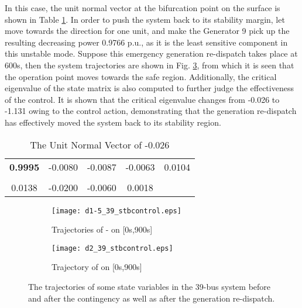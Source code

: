 \documentclass[journal]{IEEEtran}
\begin{document}
In this case, the unit normal vector at the bifurcation point on the surface is shown in Table \ref{39-stbNV}. In order to push the system back to its stability margin, let  move towards the direction  for one unit, and make the Generator 9 pick up the resulting decreasing power 0.9766 p.u., as it is the least sensitive component in this unstable mode. Suppose this emergency generation re-dispatch takes place at 600s, then the system trajectories are shown in Fig. \ref{39-bus-control}, from which it is seen that the operation point moves towards the safe region. Additionally, the critical eigenvalue of the state matrix is also computed to further judge the effectiveness of the control. It is shown that the critical eigenvalue changes from -0.026 to -1.131 owing to the control action, demonstrating that the generation re-dispatch has effectively moved the system back to its stability region.

\begin{table}[!ht]
\centering
\caption{The Unit Normal Vector of -0.026}\label{39-stbNV}
\begin{tabular}{|c|c|c|c|c|}
\hline
& &&&\\
\hline
\textbf{0.9995}&-0.0080&-0.0087&-0.0063& 0.0104\\
\hline
& &&&\\
\hline
0.0138&-0.0200& -0.0060&0.0018&\\
\hline
\end{tabular}
\end{table}

\begin{figure}[!ht]
\centering
\begin{subfigure}[t]{0.52\linewidth}
\texttt{[image: d1-5\_39\_stbcontrol.eps]}
\caption{Trajectories of - on [0s,900s]}\label{d1-5-39-control}
\end{subfigure}\begin{subfigure}[t]{0.5\linewidth}
\texttt{[image: d2\_39\_stbcontrol.eps]}
\caption{Trajectory of  on [0s,900s]}\label{d2-39-stb-control}
\end{subfigure}
\caption{The trajectories of some state variables in the 39-bus system before and after the contingency as well as after the generation re-dispatch.}\label{39-bus-control}
\end{figure}
\end{document}
